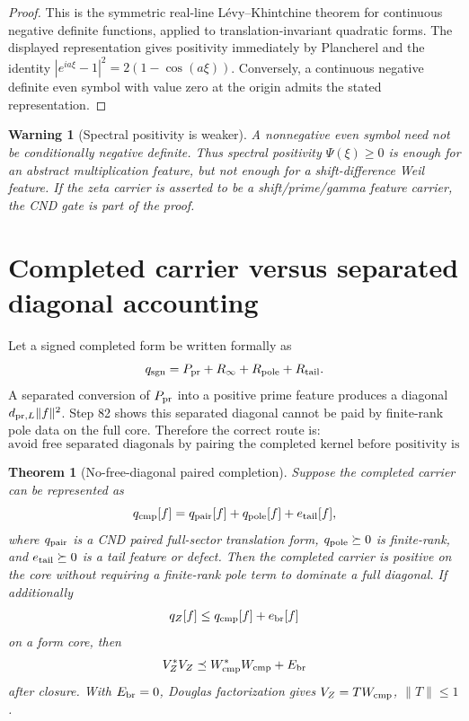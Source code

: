 \documentclass[11pt]{article}
\newtheorem{theorem}{Theorem}
\newtheorem{warning}{Warning}
\newcommand{\norm}[1]{\lVert #1\rVert}
\begin{document}
\begin{proof}
This is the symmetric real-line L\'evy--Khintchine theorem for continuous negative definite functions, applied to translation-invariant quadratic forms.  The displayed representation gives positivity immediately by Plancherel and the identity \(|e^{ia\xi}-1|^2=2(1-\cos(a\xi))\).  Conversely, a continuous negative definite even symbol with value zero at the origin admits the stated representation.
\end{proof}

\begin{warning}[Spectral positivity is weaker]
A nonnegative even symbol need not be conditionally negative definite.  Thus spectral positivity \(\Psi(\xi)\ge0\) is enough for an abstract multiplication feature, but not enough for a shift-difference Weil feature.  If the zeta carrier is asserted to be a shift/prime/gamma feature carrier, the CND gate is part of the proof.
\end{warning}

\section{Completed carrier versus separated diagonal accounting}

Let a signed completed form be written formally as
\[
q_{\rm sgn}=P_{\rm pr}+R_\infty+R_{\rm pole}+R_{\rm tail}.
\]
A separated conversion of \(P_{\rm pr}\) into a positive prime feature produces a diagonal \(d_{{\rm pr},L}\norm{f}^2\).  Step 82 shows this separated diagonal cannot be paid by finite-rank pole data on the full core.  Therefore the correct route is:
\[
\boxed{\text{avoid free separated diagonals by pairing the completed kernel before positivity is claimed.}}
\]

\begin{theorem}[No-free-diagonal paired completion]
Suppose the completed carrier can be represented as
\[
q_{\rm cmp}[f]
=
q_{\rm pair}[f]+q_{\rm pole}[f]+e_{\rm tail}[f],
\]
where \(q_{\rm pair}\) is a CND paired full-sector translation form, \(q_{\rm pole}\succeq0\) is finite-rank, and \(e_{\rm tail}\succeq0\) is a tail feature or defect.  Then the completed carrier is positive on the core without requiring a finite-rank pole term to dominate a full diagonal.  If additionally
\[
q_Z[f]\le q_{\rm cmp}[f]+e_{\rm br}[f]
\]
on a form core, then
\[
V_Z^*V_Z\preceq W_{\rm cmp}^*W_{\rm cmp}+E_{\rm br}
\]
after closure.  With \(E_{\rm br}=0\), Douglas factorization gives \(V_Z=TW_{\rm cmp}\), \(\norm{T}\le1\).
\end{theorem}
\end{document}

